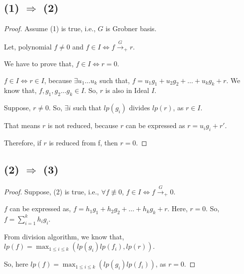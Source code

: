 \subsection{(1) $\Longrightarrow$ (2)}
\begin{proof}
Assume (1) is true, i.e., $G$ is Grobner basis.

Let, polynomial $f \ne 0$ and $ f \in I \Longleftrightarrow f {\mathop \rightarrow \limits^{G}}_{+} r$.

We have to prove that, $ f \in I \Longleftrightarrow r = 0$.

\begin{observation}
$f \in I \Longleftrightarrow r \in I$, because $\exists u_1 \ldots u_k$ such that, $f = u_1g_1 + u_2g_2 + \ldots + u_kg_k + r$. We know that, $f, g_1,g_2 \ldots g_k \in I$. So, $r$ is also in Ideal $I$.
\end{observation}

Suppose, $r \neq 0$. So, $\exists i$ such that $lp(g_i)$ divides $lp(r)$, as $r \in I$.

That means $r$ is not reduced, because $r$ can be expressed as $r = u_ig_i + r'$.

Therefore, if $r$ is reduced from f, then $r = 0$.

\end{proof}

\subsection{(2) $\Longrightarrow$ (3)}
\begin{proof}
Suppose, (2) is true, i.e., $ \forall f \not\equiv 0$, $ f \in I \Longleftrightarrow f {\mathop \rightarrow \limits^{G}}_{+} 0$.

$f$ can be expressed as,  $f = h_1g_1 + h_2g_2 + \ldots + h_kg_k + r$. Here, $ r = 0$. So, $f = \sum_{i =1}^{k} h_ig_i$.

From division algorithm, we know that, $lp(f) = \max_{1 \le i \le k} ( lp(g_i)lp(f_i), lp(r))$.

So, here $lp(f) = \max_{1 \le i \le k} ( lp(g_i)lp(f_i))$, as $ r = 0 $.

\end{proof}

